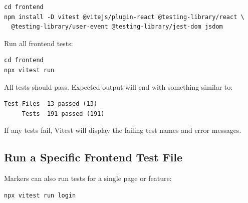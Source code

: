 \documentclass[12pt]{article}
\begin{document}
\begin{lstlisting}
cd frontend
npm install -D vitest @vitejs/plugin-react @testing-library/react \
  @testing-library/user-event @testing-library/jest-dom jsdom
\end{lstlisting}

\newpage

Run all frontend tests:

\begin{lstlisting}
cd frontend
npx vitest run
\end{lstlisting}

All tests should pass. Expected output will end with something similar to:

\begin{lstlisting}
Test Files  13 passed (13)
     Tests  191 passed (191)
\end{lstlisting}

If any tests fail, Vitest will display the failing test names and error messages.

\subsection{Run a Specific Frontend Test File}

Markers can also run tests for a single page or feature:

\begin{lstlisting}
npx vitest run login
\end{lstlisting}
\end{document}
